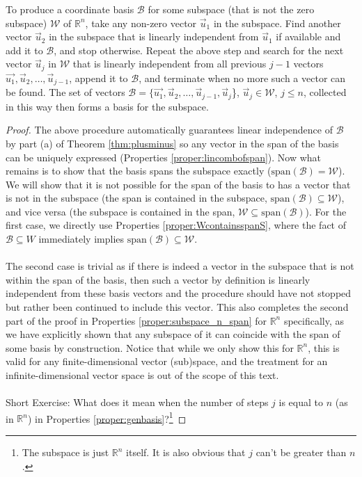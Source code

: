 \begin{proper}
\label{proper:genbasis}
To produce a coordinate basis $\mathcal{B}$ for some subspace (that is not the zero subspace) $\mathcal{W}$ of $\mathbb{R}^n$, take any non-zero vector $\vec{u}_1$ in the subspace. Find another vector $\vec{u}_2$ in the subspace that is linearly independent from $\vec{u}_1$ if available and add it to $\mathcal{B}$, and stop otherwise. Repeat the above step and search for the next vector $\vec{u}_j$ in $\mathcal{W}$ that is linearly independent from all previous $j-1$ vectors $\vec{u_1}, \vec{u}_2, \ldots, \vec{u}_{j-1}$, append it to $\mathcal{B}$, and terminate when no more such a vector can be found. The set of vectors $\mathcal{B} = \{\vec{u_1}, \vec{u}_2, \ldots, \vec{u}_{j-1}, \vec{u}_j$\}, $\vec{u}_j \in \mathcal{W}$, $j \leq n$, collected in this way then forms a basis for the subspace.
\end{proper}
\begin{proof}
The above procedure automatically guarantees linear independence of $\mathcal{B}$ by part (a) of Theorem \ref{thm:plusminus} so any vector in the span of the basis can be uniquely expressed (Properties \ref{proper:lincombofspan}). Now what remains is to show that the basis spans the subspace exactly ($\text{span}(\mathcal{B}) = \mathcal{W}$). We will show that it is not possible for the span of the basis to has a vector that is not in the subspace (the span is contained in the subspace, $\text{span}(\mathcal{B}) \subseteq \mathcal{W}$), and vice versa (the subspace is contained in the span, $\mathcal{W} \subseteq \text{span}(\mathcal{B})$). For the first case, we directly use Properties \ref{proper:WcontainsspanS}, where the fact of $\mathcal{B} \subseteq W$ immediately implies $\text{span}(\mathcal{B}) \subseteq \mathcal{W}$. \\
\\
The second case is trivial as if there is indeed a vector in the subspace that is not within the span of the basis, then such a vector by definition is linearly independent from these basis vectors and the procedure should have not stopped but rather been continued to include this vector. This also completes the second part of the proof in Properties \ref{proper:subspace_n_span} for $\mathbb{R}^n$ specifically, as we have explicitly shown that any subspace of it can coincide with the span of some basis by construction. Notice that while we only show this for $\mathbb{R}^n$, this is valid for any finite-dimensional vector (sub)space, and the treatment for an infinite-dimensional vector space is out of the scope of this text. \\
\\
Short Exercise: What does it mean when the number of steps $j$ is equal to $n$ (as in $\mathbb{R}^n$) in Properties \ref{proper:genbasis}?\footnote{The subspace is just $\mathbb{R}^n$ itself. It is also obvious that $j$ can't be greater than $n$.}
\end{proof}

